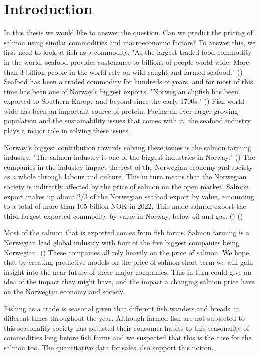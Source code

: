 \section{Introduction}

In this thesis we would like to answer the question. 
Can we predict the pricing of salmon using similar commodities and macroeconomic factors? To answer this, we first need to look at fish as a commodity. "As the largest traded food commodity in the world, seafood provides sustenance to billions of people world-wide. More than 3 billion people in the world rely on wild-caught and farmed seafood." (\cite{wwf_2019}) Seafood has been a traded commodity for hundreds of years, and for most of this time has been one of Norway's biggest exports. "Norwegian clipfish has been exported to Southern Europe and beyond since the early 1700s." (\cite{seafood_from_norway_clipfish}) Fish world-wide has been an important source of protein. Facing an ever larger growing population and the sustainability issues that comes with it, the seafood industry plays a major role in solving these issues.

Norway's biggest contribution towards solving these issues is the salmon farming industry. "The salmon industry is one of the biggest industries in Norway." (\cite{Johansen_et_al_2019}) The companies in the industry impact the rest of the Norwegian economy and society as a whole through labour and culture. This in turn means that the Norwegian society is indirectly affected by the price of salmon on the open market. Salmon export makes up about 2/3 of the Norwegian seafood export by value, amounting to a total of more than 105 billion NOK in 2022. This made salmon export the third largest exported commodity by value in Norway, below oil and gas. (\cite{e24_gasprice_2023}) (\cite{seafood_nokkeltall})

Most of the salmon that is exported comes from fish farms. Salmon farming is a Norwegian lead global industry with four of the five biggest companies being Norwegian. (\cite{ilaks_2020}) These companies all rely heavily on the price of salmon. We hope that by creating predictive models on the price of salmon short term we will gain insight into the near future of these major companies. This in turn could give an idea of the impact they might have, and the impact a changing salmon price have on the Norwegian economy and society.

Fishing as a trade is seasonal given that different fish wanders and breads at different times throughout the year. Although farmed fish are not subjected to this seasonality society has adjusted their consumer habits to this seasonality of commodities long before fish farms and we suspected that this is the case for the salmon too. The quantitative data for sales also support this notion.

